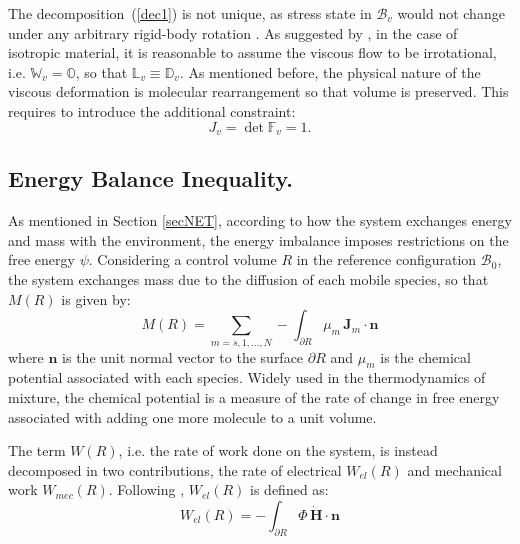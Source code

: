 \documentclass[runningheads]{llncs}
\newcommand{\F}{\ensuremath{\mathbb{F}}}
\newcommand{\LL}{\ensuremath{\mathbb{L}}}
\begin{document}
The decomposition~(\ref{dec1}) is not unique, as stress state in $\mathcal{B}_v$ would not change under any arbitrary rigid-body rotation \cite{multdec}. As suggested by \cite{Plasto}, in the case of isotropic material, it is reasonable to assume the viscous flow to be irrotational, i.e. $\mathbb{W}_v=\mathbb{O}$, so that $\LL_v \equiv \mathbb{D}_v$.
As mentioned before, the physical nature of the viscous deformation is molecular rearrangement so that volume is preserved. This requires to introduce the additional constraint:
\begin{equation}
J_v=\det \F_v= 1.\label{Jv}
\end{equation}

\subsection{Energy Balance Inequality.}
\label{sec_ine}

As mentioned in Section \ref{secNET}, according to how the system exchanges energy and mass with the environment, the energy imbalance imposes restrictions on the free energy $\psi$. Considering a control volume $R$ in the reference configuration $\mathcal{B}_0$, the system exchanges mass due to the diffusion of each mobile species, so that $M(R)$ is given by:
\begin{equation}
M(R)= \sum\limits_{m=s,1,\ldots,N} - \int_{\partial R} \mu_m \,\mathbf{J}_m \cdot \mathbf{n} 
\end{equation}
where $\mathbf{n}$ is the unit normal vector to the surface $\partial R$ and $\mu_m$ is the chemical potential associated with each species. Widely used in the thermodynamics of mixture, the chemical potential is a measure of the rate of change in free energy associated with adding one more molecule to a unit volume.

The term $W(R)$, i.e. the rate of work done on the system, is instead decomposed in two contributions, the rate of electrical $W_{el}(R)$ and mechanical work $W_{mec}(R)$. Following \cite{DROZDOVph}, $W_{el}(R)$ is defined as:
\begin{equation}
W_{el}(R) = -\int_{\partial R} \Phi\, \dot{\mathbf{H}}\cdot \mathbf{n}
\end{equation}
\end{document}
